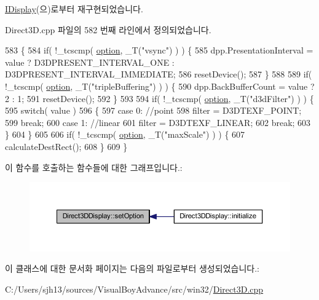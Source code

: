 \mbox{\hyperlink{class_i_display_a1766244708c252bb8781892c76c20ba9}{I\+Display}}(으)로부터 재구현되었습니다.



Direct3\+D.\+cpp 파일의 582 번째 라인에서 정의되었습니다.


\begin{DoxyCode}
583 \{
584     \textcolor{keywordflow}{if}( !\_tcscmp( \mbox{\hyperlink{structoption}{option}}, \_T(\textcolor{stringliteral}{"vsync"}) ) ) \{
585         dpp.PresentationInterval = value ? D3DPRESENT\_INTERVAL\_ONE : D3DPRESENT\_INTERVAL\_IMMEDIATE;
586         resetDevice();
587     \}
588 
589     \textcolor{keywordflow}{if}( !\_tcscmp( \mbox{\hyperlink{structoption}{option}}, \_T(\textcolor{stringliteral}{"tripleBuffering"}) ) ) \{
590         dpp.BackBufferCount = value ? 2 : 1;
591         resetDevice();
592     \}
593 
594     \textcolor{keywordflow}{if}( !\_tcscmp( \mbox{\hyperlink{structoption}{option}}, \_T(\textcolor{stringliteral}{"d3dFilter"}) ) ) \{
595         \textcolor{keywordflow}{switch}( value )
596         \{
597         \textcolor{keywordflow}{case} 0: \textcolor{comment}{//point}
598             filter = D3DTEXF\_POINT;
599             \textcolor{keywordflow}{break};
600         \textcolor{keywordflow}{case} 1: \textcolor{comment}{//linear}
601             filter = D3DTEXF\_LINEAR;
602             \textcolor{keywordflow}{break};
603         \}
604     \}
605 
606     \textcolor{keywordflow}{if}( !\_tcscmp( \mbox{\hyperlink{structoption}{option}}, \_T(\textcolor{stringliteral}{"maxScale"}) ) ) \{
607         calculateDestRect();
608     \}
609 \}
\end{DoxyCode}
이 함수를 호출하는 함수들에 대한 그래프입니다.\+:
\nopagebreak
\begin{figure}[H]
\begin{center}
\leavevmode
\includegraphics[width=350pt]{class_direct3_d_display_a9fb19225514b70c7178aa871c9852936_icgraph}
\end{center}
\end{figure}


이 클래스에 대한 문서화 페이지는 다음의 파일로부터 생성되었습니다.\+:\begin{DoxyCompactItemize}
\item 
C\+:/\+Users/sjh13/sources/\+Visual\+Boy\+Advance/src/win32/\mbox{\hyperlink{_direct3_d_8cpp}{Direct3\+D.\+cpp}}\end{DoxyCompactItemize}
